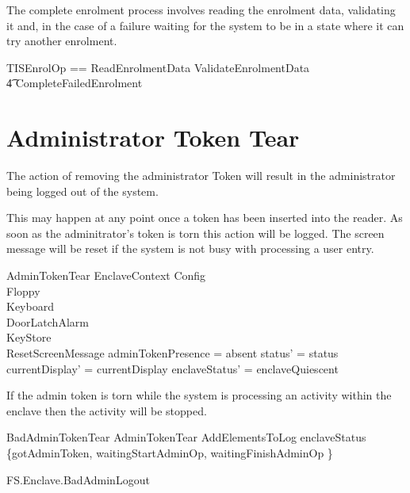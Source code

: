 The complete enrolment process involves reading the enrolment data,
validating it and, in the case of a failure waiting for the system to
be in a state where it can try another enrolment.

\begin{zed}
        TISEnrolOp == ReadEnrolmentData \lor
ValidateEnrolmentData 
\\      \t4 \lor CompleteFailedEnrolment
\end{zed}

\section{Administrator Token Tear}

The action of removing the administrator Token will result in the
administrator being logged out of the system.

This may happen at any point once a token has been inserted into the
reader. As soon as the adminitrator's token is torn this action will
be logged. The screen message will be reset if the system is not busy
with processing a user entry.

\begin{schema}{AdminTokenTear}
         EnclaveContext
\also
        \Xi Config
\\      \Xi Floppy
\\      \Xi Keyboard
\\      \Xi DoorLatchAlarm
\\      \Xi KeyStore
\\      ResetScreenMessage
\where
        adminTokenPresence = absent
\also   
        status' = status
\\      currentDisplay' = currentDisplay
\also
        enclaveStatus' = enclaveQuiescent
\end{schema}

If the admin token is torn while the system is processing an activity
within the enclave then the activity will be stopped.

\begin{schema}{BadAdminTokenTear} 
        AdminTokenTear
\also
        AddElementsToLog
\where
        enclaveStatus \in \{gotAdminToken, waitingStartAdminOp, waitingFinishAdminOp \}
\end{schema}

\begin{traceunit}{FS.Enclave.BadAdminLogout}
\end{traceunit}

